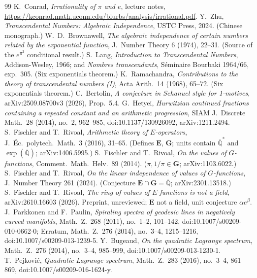\documentclass[11pt]{amsart}
\theoremstyle{definition}
\theoremstyle{remark}
\numberwithin{equation}{section}
\newcommand{\Q}{\mathbb{Q}}
\newcommand{\ee}{e}
\begin{document}
\begin{thebibliography}{99}
 K.~Conrad, \emph{Irrationality of $\pi$ and $e$}, lecture notes, \url{https://kconrad.math.uconn.edu/blurbs/analysis/irrational.pdf}.
 Y.~Zhu, \emph{Transcendental Numbers: Algebraic Independence}, USTC Press, 2024. (Chinese monograph.)
 W.~D.~Brownawell, \emph{The algebraic independence of certain numbers related by the exponential function}, J.~Number Theory 6 (1974), 22--31. (Source of the $\ee^{\pi^2}$ conditional result.)
 S.~Lang, \emph{Introduction to Transcendental Numbers}, Addison-Wesley, 1966; and \emph{Nombres transcendants}, S\'eminaire Bourbaki 1964/66, exp.~305. (Six exponentials theorem.)
 K.~Ramachandra, \emph{Contributions to the theory of transcendental numbers (I)}, Acta Arith.~14 (1968), 65--72. (Six exponentials theorem.)
 C.~Bertolin, \emph{A conjecture in Schanuel style for 1-motives}, arXiv:2509.08700v3 (2026), Prop.~5.4.
 G.~Hetyei, \emph{Hurwitzian continued fractions containing a repeated constant and an arithmetic progression}, SIAM J.~Discrete Math.~28 (2014), no.~2, 962--985, doi:10.1137/130926092, arXiv:1211.2494.
 S.~Fischler and T.~Rivoal, \emph{Arithmetic theory of $E$-operators}, J.~\'Ec.~polytech.~Math.~3 (2016), 31--65. (Defines $\mathbf{E}$, $\mathbf{G}$; units contain $\overline{\Q}^*$ and $\exp(\overline{\Q})$; arXiv:1406.5995.)
 S.~Fischler and T.~Rivoal, \emph{On the values of $G$-functions}, Comment.~Math.~Helv.~89 (2014). ($\pi,1/\pi\in\mathbf{G}$; arXiv:1103.6022.)
 S.~Fischler and T.~Rivoal, \emph{On the linear independence of values of $G$-functions}, J.~Number Theory 261 (2024). (Conjecture $\mathbf{E}\cap\mathbf{G}=\overline{\Q}$; arXiv:2301.13518.)
 S.~Fischler and T.~Rivoal, \emph{The ring of values of $E$-functions is not a field}, arXiv:2610.16603 (2026). Preprint, unreviewed; $\mathbf{E}$ not a field, unit conjecture $\alpha e^\beta$.
 J.~Parkkonen and F.~Paulin, \emph{Spiraling spectra of geodesic lines in negatively curved manifolds}, Math.~Z.~268 (2011), no.~1--2, 101--142, doi:10.1007/s00209-010-0662-0; Erratum, Math.~Z.~276 (2014), no.~3--4, 1215--1216, doi:10.1007/s00209-013-1239-5.
 Y.~Bugeaud, \emph{On the quadratic Lagrange spectrum}, Math.~Z.~276 (2014), no.~3--4, 985--999, doi:10.1007/s00209-013-1230-1.
 T.~Pejkovi\'c, \emph{Quadratic Lagrange spectrum}, Math.~Z.~283 (2016), no.~3--4, 861--869, doi:10.1007/s00209-016-1624-y.

\end{thebibliography}
\end{document}
